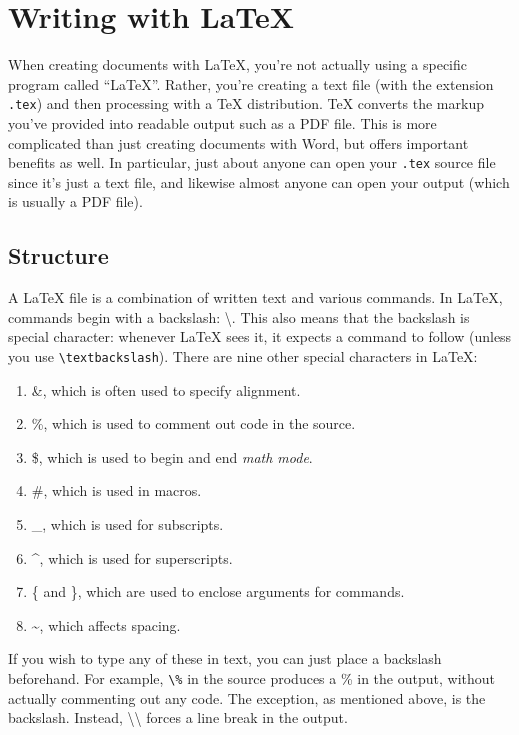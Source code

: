 \documentclass{article}
\begin{document}
\section{Writing with \LaTeX}

When creating documents with \LaTeX{}, you're not actually using a specific program called ``\LaTeX{}''.
Rather, you're creating a text file (with the extension \texttt{.tex}) and then processing with a \TeX{} distribution.
\TeX{} converts the markup you've provided into readable output such as a PDF file.
This is more complicated than just creating documents with Word, but offers important benefits as well.
In particular, just about anyone can open your \texttt{.tex} source file since it's just a text file, and likewise almost anyone can open your output (which is usually a PDF file).

\subsection{Structure}

A \LaTeX{} file is a combination of written text and various commands.
In \LaTeX, commands begin with a backslash: \textbackslash.
This also means that the backslash is special character: whenever \LaTeX{} sees it, it expects a command to follow (unless you use \texttt{\textbackslash textbackslash}).
There are nine other special characters in \LaTeX:
\begin{enumerate}
    \item \&, which is often used to specify alignment.
    \item \%, which is used to comment out code in the source.
    \item \$, which is used to begin and end \textit{math mode}.
    \item \#, which is used in macros.
    \item \_, which is used for subscripts.
    \item \^{}, which is used for superscripts.
    \item \{ and \}, which are used to enclose arguments for commands.
    \item \~{}, which affects spacing.
\end{enumerate}
If you wish to type any of these in text, you can just place a backslash beforehand.
For example, \texttt{\textbackslash \%} in the source produces a \% in the output, without actually commenting out any code.
The exception, as mentioned above, is the backslash.
Instead, \textbackslash\textbackslash{} forces a line break in the output.
\end{document}
